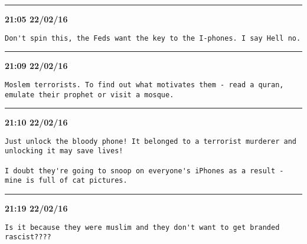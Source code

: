 \hrule%

\begin{adjustwidth}{0cm}{0cm}
\footnotesize \textbf{21:05 22/02/16}

\begin{lstlisting}[breaklines, breakatwhitespace, basicstyle=\small, frame=leftline]
Don't spin this, the Feds want the key to the I-phones. I say Hell no.
\end{lstlisting}
\end{adjustwidth}

\hrule%

\begin{adjustwidth}{0cm}{0cm}
\footnotesize \textbf{21:09 22/02/16}

\begin{lstlisting}[breaklines, breakatwhitespace, basicstyle=\small, frame=leftline]
Moslem terrorists. To find out what motivates them - read a quran, emulate their prophet or visit a mosque.
\end{lstlisting}
\end{adjustwidth}

\hrule%

\begin{adjustwidth}{0cm}{0cm}
\footnotesize \textbf{21:10 22/02/16}

\begin{lstlisting}[breaklines, breakatwhitespace, basicstyle=\small, frame=leftline]
Just unlock the bloody phone! It belonged to a terrorist murderer and unlocking it may save lives!

I doubt they're going to snoop on everyone's iPhones as a result - mine is full of cat pictures.
\end{lstlisting}
\end{adjustwidth}

\hrule%

\begin{adjustwidth}{0cm}{0cm}
\footnotesize \textbf{21:19 22/02/16}

\begin{lstlisting}[breaklines, breakatwhitespace, basicstyle=\small, frame=leftline]
Is it because they were muslim and they don't want to get branded rascist????
\end{lstlisting}
\end{adjustwidth}


